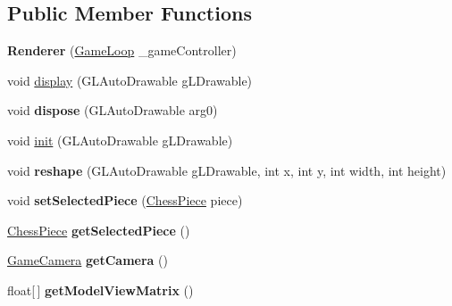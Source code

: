 \subsection*{Public Member Functions}
\begin{DoxyCompactItemize}
\item 
\hypertarget{classview_1_1_renderer_af97a8eb943cc205b1a1ea934c3e78776}{{\bfseries Renderer} (\hyperlink{classcontroller_1_1_game_loop}{Game\-Loop} \-\_\-game\-Controller)}\label{classview_1_1_renderer_af97a8eb943cc205b1a1ea934c3e78776}

\item 
void \hyperlink{classview_1_1_renderer_a735a52a16cb1a2c7b21b0b47e140bccc}{display} (G\-L\-Auto\-Drawable g\-L\-Drawable)
\item 
\hypertarget{classview_1_1_renderer_a83b1d62f674e3b265dd7f1265b93456d}{void {\bfseries dispose} (G\-L\-Auto\-Drawable arg0)}\label{classview_1_1_renderer_a83b1d62f674e3b265dd7f1265b93456d}

\item 
void \hyperlink{classview_1_1_renderer_a8cc3379eb90aa67965f780ec5d93b95a}{init} (G\-L\-Auto\-Drawable g\-L\-Drawable)
\item 
\hypertarget{classview_1_1_renderer_a21dae4f98ad6665bbd93318f295cb0d7}{void {\bfseries reshape} (G\-L\-Auto\-Drawable g\-L\-Drawable, int x, int y, int width, int height)}\label{classview_1_1_renderer_a21dae4f98ad6665bbd93318f295cb0d7}

\item 
\hypertarget{classview_1_1_renderer_a538710e08ee1d46f7f25f4ecc8d2f034}{void {\bfseries set\-Selected\-Piece} (\hyperlink{classmodel_1_1_chess_piece}{Chess\-Piece} piece)}\label{classview_1_1_renderer_a538710e08ee1d46f7f25f4ecc8d2f034}

\item 
\hypertarget{classview_1_1_renderer_ac5de3cf59a0aa541a7b46c4c3bbab477}{\hyperlink{classmodel_1_1_chess_piece}{Chess\-Piece} {\bfseries get\-Selected\-Piece} ()}\label{classview_1_1_renderer_ac5de3cf59a0aa541a7b46c4c3bbab477}

\item 
\hypertarget{classview_1_1_renderer_a92f219c1d810a39003a9480594978cad}{\hyperlink{classview_1_1_game_camera}{Game\-Camera} {\bfseries get\-Camera} ()}\label{classview_1_1_renderer_a92f219c1d810a39003a9480594978cad}

\item 
\hypertarget{classview_1_1_renderer_ab38191d5cd62c4bfc8da1ffa4403b993}{float\mbox{[}$\,$\mbox{]} {\bfseries get\-Model\-View\-Matrix} ()}\label{classview_1_1_renderer_ab38191d5cd62c4bfc8da1ffa4403b993}


\end{DoxyCompactItemize}
